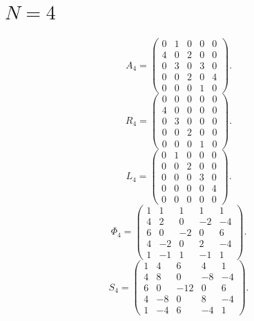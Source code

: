 \documentclass[11pt]{amsart}
\begin{document}
\section*{$N=4$}
\[
A_{4}=\begin{pmatrix}
0 & 1 & 0 & 0 & 0 \\
4 & 0 & 2 & 0 & 0 \\
0 & 3 & 0 & 3 & 0 \\
0 & 0 & 2 & 0 & 4 \\
0 & 0 & 0 & 1 & 0
\end{pmatrix}.
\]
\[
R_{4}=\begin{pmatrix}
0 & 0 & 0 & 0 & 0 \\
4 & 0 & 0 & 0 & 0 \\
0 & 3 & 0 & 0 & 0 \\
0 & 0 & 2 & 0 & 0 \\
0 & 0 & 0 & 1 & 0
\end{pmatrix}.
\]
\[
L_{4}=\begin{pmatrix}
0 & 1 & 0 & 0 & 0 \\
0 & 0 & 2 & 0 & 0 \\
0 & 0 & 0 & 3 & 0 \\
0 & 0 & 0 & 0 & 4 \\
0 & 0 & 0 & 0 & 0
\end{pmatrix}.
\]
\[
\Phi_{4}=\begin{pmatrix}
1 & 1 & 1 & 1 & 1 \\
4 & 2 & 0 & -2 & -4 \\
6 & 0 & -2 & 0 & 6 \\
4 & -2 & 0 & 2 & -4 \\
1 & -1 & 1 & -1 & 1
\end{pmatrix}.
\]
\[
S_{4}=\begin{pmatrix}
1 & 4 & 6 & 4 & 1 \\
4 & 8 & 0 & -8 & -4 \\
6 & 0 & -12 & 0 & 6 \\
4 & -8 & 0 & 8 & -4 \\
1 & -4 & 6 & -4 & 1
\end{pmatrix}.
\]
\end{document}
